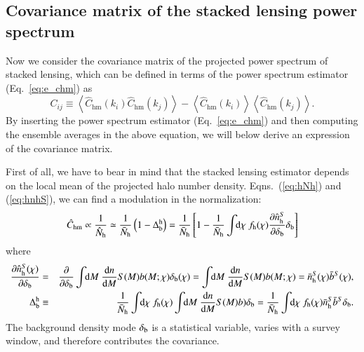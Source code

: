 \documentclass[onecolumn,notitlepage,showpacs,amsmath,amssymb,prd,floatfix]{revtex4-1}
\def\ave#1{\left\langle #1 \right\rangle}
\newcommand{\dr}{\mathrm{d}}
\newcommand{\deltab}{\delta_{\rm b}}
\newcommand{\hchm}{\hat{C}_{\mathrm{hm}}}
\newcommand{\bnh}{\frac{\dr n}{\dr M}}
\newcommand{\bnhs}{\bar{n}_{\rm h}^S}
\newcommand{\hNh}{\hat{N}_{\rm h}}
\newcommand{\bNh}{\bar{N}_{\rm h}}
\newcommand{\hnh}{\hat{n}_{\mathrm{h}}}
\newcommand{\br}{{\rm b}}
\begin{document}
\subsection{Covariance matrix of the stacked lensing power spectrum}

Now we consider the covariance matrix of the projected power spectrum of
stacked lensing, which can be defined in terms of the power spectrum
estimator (Eq.~\ref{eq:e_chm}) as
%
\begin{equation}
 C_{ij}\equiv
  \ave{\hchm(k_i)\hchm(k_j)}-\ave{\hchm(k_i)}\ave{\hchm(k_j)}.
  \label{eq:def_cov}
\end{equation}
%
By inserting the power spectrum estimator (Eq.~\ref{eq:e_chm}) and then
computing the ensemble averages in the above equation, we will below
derive an expression of the covariance matrix. 

First of all, we have to bear in mind that
the stacked lensing estimator depends on the local mean of the projected
halo number density. Eqns.~(\ref{eq:hNh}) and (\ref{eq:hnhS}), we can
find a modulation in the normalization: 
%
\begin{equation}
 \hchm\propto
  \frac{1}{\hNh}\simeq \frac{1}{\bNh}\left(1-\Delta^{\rm h}_{\br}\right)
  = \frac{1}{\bNh}\left[1-\frac{1}{\bNh}
		   \int\!\!\dr\chi~f_{\rm h}(\chi)\frac{\partial \hnh^S}{\partial \deltab}\deltab\right]
\label{eq:def_Deltahb}
\end{equation}
%
where
%
\begin{eqnarray}
 \frac{\partial \hnh^S(\chi)}{\partial \deltab}&=&\frac{\partial }{\partial
  \deltab} \int\!\!\dr M~ \bnh S(M) b(M;\chi)\deltab(\chi) = 
  \int\!\!\dr M~ \bnh S(M) b(M;\chi)= \bnhs(\chi) \bar{b}^S(\chi),\nonumber\\
 \Delta_{\br}^{\rm h}&\equiv& \frac{1}{\bNh}\int\!\!\dr\chi~f_{\rm
  h}(\chi)\int\!\!\dr M~ \bnh S(M) b)
  \deltab=\frac{1}{\bNh}\int\!\!\dr\chi~f_{\rm h}(\chi)\bnhs\bar{b}^S\deltab.
\label{eq:dhnhS_ddb}
\end{eqnarray}
%
The background density mode $\deltab$ is a statistical variable, varies
with a survey window, and therefore contributes the covariance.
\end{document}
